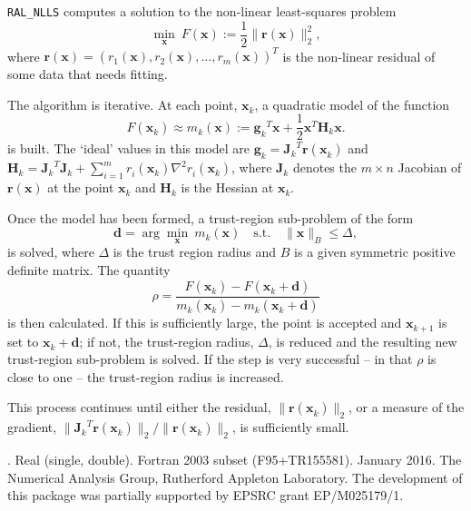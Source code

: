 \documentclass{spec}
\newcommand{\libraryname}{RAL}
\newcommand{\packagename}{NLLS}
\newcommand{\fullpackagename}{\libraryname\_\packagename}
\newcommand{\versionum}{0.5.0}
\newcommand{\versiondate}{15 January 2016}
\newcommand{\vx}{ {\bm x} } %
\newcommand{\vr}{ {\bm r} } %
\newcommand{\vg}{ {\bm g} } %
\newcommand{\vd}{ {\bm d} } %
\newcommand{\vH}{ {\bm H} } %
\newcommand{\vJ}{ {\bm J} } %
\newcommand{\iter}[2][k]{ #2_{#1}^{}} %
\newcommand{\comp}[2][i]{ #2_{#1}^{}} %
\begin{document}
\hslheader

\hslsummary
{\tt \fullpackagename} computes a solution to the non-linear least-squares problem
\begin{equation}
\min_\vx \  F(\vx) := \frac{1}{2}\| \vr(\vx) \|_2^2,
\label{eq:nlls_problem}
\end{equation}
where $\vr(\vx) =(\comp[1]{r}(\vx), \comp[2]{r}(\vx),...,\comp[m]{r}(\vx))^T$ is the non-linear residual of 
some data that needs fitting.

The algorithm is iterative.
At each point, $\iter{\vx}$, a quadratic model of the function
\[
F(\iter{\vx}) \approx \iter{m}(\vx) := {\iter{\vg}}^T \vx + \frac{1}{2} {\vx}^T \iter{\vH} \vx.
\]
is built.
The `ideal' values in this model are $\iter{\vg} = {\iter{\vJ}}^T\vr(\iter{\vx})$ and 
$\iter{\vH} = {\iter{\vJ}}^T\iter{\vJ} + \sum_{i = 1}^m \comp{r}(\iter{\vx}) \nabla^2 \comp{r}(\iter{\vx})$, 
where $\iter{\vJ}$ denotes the $m \times n$ Jacobian of $\vr(\vx)$ at the point $\iter{\vx}$
and $\iter{\vH}$ is the Hessian at $\iter{\vx}$.

Once the model has been formed, a trust-region sub-problem of the form
\[
\vd = \arg \min_{\vx} \ \iter{m} (\vx) \quad \mathrm{s.t.} \quad  \|\vx\|_B \leq \Delta,
\]
is solved, 
where $\Delta$ is the trust region radius and $B$ is a given symmetric positive definite matrix. 
The quantity
\[\rho = \frac{F(\iter{\vx}) - F(\iter{\vx} + \vd)}{\iter{m}(\iter{\vx}) - \iter{m}(\iter{\vx} + \vd)}\]
is then calculated.
If this is sufficiently large, the point is accepted and  $\iter[k+1]{\vx}$ is set to $\iter{\vx} + \vd$; if not, the trust-region radius, $\Delta$, 
is reduced and  the resulting new trust-region sub-problem is solved.  If the step is very successful -- in that $\rho$ is close to one -- 
the trust-region radius is increased.

This process continues until either the residual, $\|\vr(\iter{\vx})\|_2$, or a measure of the gradient,
$\|{\iter{\vJ}}^T\vr(\iter{\vx})\|_2 / \|\vr(\iter{\vx})\|_2$, is sufficiently small.


\hslattributes
\hslversions{\versionum\ (\versiondate)}.
\hslIRDCZ Real (single, double).
\hsllanguage Fortran 2003 subset (F95+TR155581).  
\hsldate January 2016. 
\hslorigin The Numerical Analysis Group, Rutherford Appleton Laboratory.
\hslremark The development of this package was 
partially supported by EPSRC grant EP/M025179/1.
\end{document}
